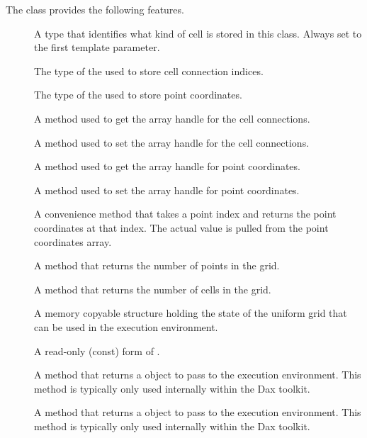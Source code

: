 The  class provides the following features.
\begin{description}
\item[] A type that identifies what kind of cell is
  stored in this class. Always set to the first template parameter.
\item[] The type of the 
  used to store cell connection indices.
\item[] The type of the
   used to store point coordinates.
\item[] A method used to get the array handle
  for the cell connections.
\item[] A method used to set the array handle
  for the cell connections.
\item[] A method used to get the array handle
  for point coordinates.
\item[] A method used to set the array handle
  for point coordinates.
\item[] A convenience method that takes a
  point index and returns the point coordinates at that index. The actual
  value is pulled from the point coordinates array.
\item[] A method that returns the number of
  points in the grid.
\item[] A method that returns the number of
  cells in the grid.
\item[] A memory copyable structure
  holding the state of the uniform grid that can be used in the execution
  environment.
\item[] A read-only (const) form of
  .
\item[] A method that returns a
   object to pass to the execution
  environment. This method is typically only used internally within the Dax
  toolkit.
\item[] A method that returns a
   object to pass to the execution
  environment. This method is typically only used internally within the Dax
  toolkit.
\end{description}

